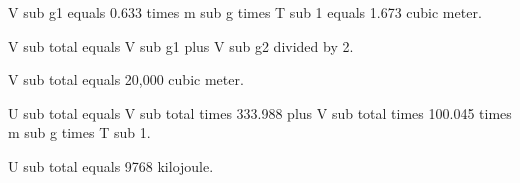 V sub g1 equals 0.633 times m sub g times T sub 1 equals 1.673 cubic meter.

V sub total equals V sub g1 plus V sub g2 divided by 2.

V sub total equals 20,000 cubic meter.

U sub total equals V sub total times 333.988 plus V sub total times 100.045 times m sub g times T sub 1.

U sub total equals 9768 kilojoule.
